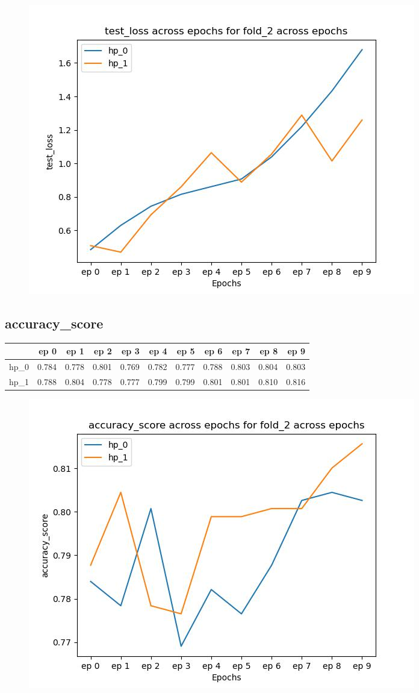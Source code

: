 \documentclass{article}
\begin{document}
\begin{figure}[H]
\includegraphics[scale = 0.75]{fold_2/test_loss}
\end{figure}
\subsection{accuracy\_score}
\begin{tabular}{lrrrrrrrrrr}
\toprule
{} &   ep 0 &   ep 1 &   ep 2 &   ep 3 &   ep 4 &   ep 5 &   ep 6 &   ep 7 &   ep 8 &   ep 9 \\
\midrule
hp\_0 &  0.784 &  0.778 &  0.801 &  0.769 &  0.782 &  0.777 &  0.788 &  0.803 &  0.804 &  0.803 \\
hp\_1 &  0.788 &  0.804 &  0.778 &  0.777 &  0.799 &  0.799 &  0.801 &  0.801 &  0.810 &  0.816 \\
\bottomrule
\end{tabular}

\begin{figure}[H]
\includegraphics[scale = 0.75]{fold_2/accuracy_score}
\end{figure}
\end{document}
